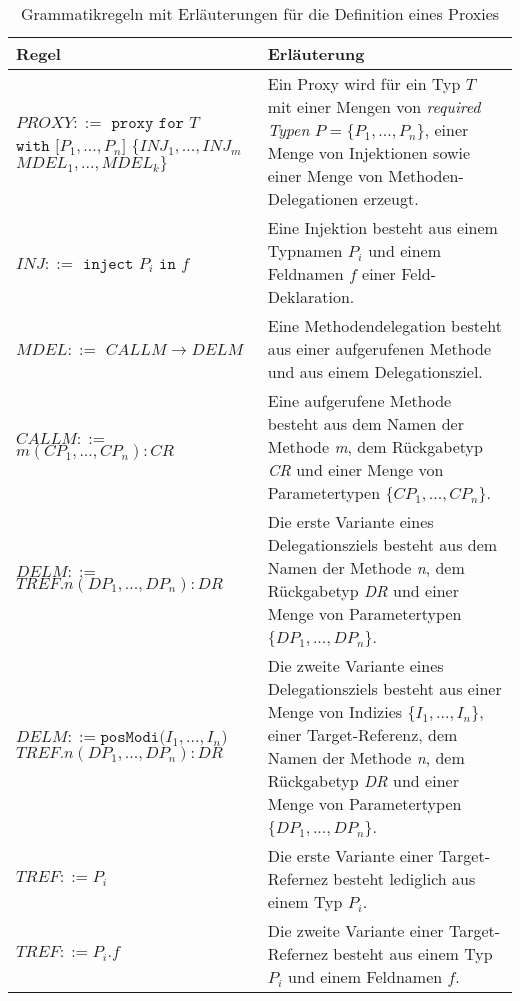 \documentclass[a4paper,12pt]{article}
\begin{document}
\begin{table}[H]
\centering
\begin{tabular}{|p{5cm}|p{9cm}|}
\hline
\hline
\centering\textbf{Regel} & \textbf{Erläuterung} \\
\hline
\hline
$\mathit{PROXY} ::=$\newline
$\texttt{proxy } \texttt{for } T$\newline
$ \texttt{with [}\mathit{P_1},...,\mathit{P_n}\texttt{]}$ \newline
$\texttt{\{} \mathit{INJ_1},...,\mathit{INJ_m}$\newline
$\mathit{MDEL_1},...,\mathit{MDEL_k} \texttt{\}}$
 & Ein Proxy wird für ein Typ $T$ mit einer Mengen von \emph{required Typen} $P = \{P_1,...,P_n\}$, einer Menge von Injektionen sowie einer Menge von Methoden-Delegationen erzeugt.\\
\hline
$\mathit{INJ} ::=$\newline 
$\texttt{inject } P_i \texttt{ in } f$ 
& Eine Injektion besteht aus einem Typnamen $P_i$ und einem Feldnamen $f$ einer Feld-Deklaration.\\
\hline
$\mathit{MDEL} ::=$\newline
$CALLM \rightarrow DELM $  & Eine Methodendelegation besteht aus einer aufgerufenen Methode und aus einem Delegationsziel.\\
\hline
$\mathit{CALLM} ::=$\newline $m(\mathit{CP_1},...,\mathit{CP_n}):CR $  & Eine aufgerufene Methode besteht aus dem Namen der Methode \emph{m}, dem Rückgabetyp \emph{CR} und einer Menge von Parametertypen $\{\mathit{CP_1},...,\mathit{CP_n}\}$.\\
\hline
$\mathit{DELM} ::=$\newline 
$\mathit{TREF}\texttt{.}n(\mathit{DP_1},...,\mathit{DP_n}):DR $  
& Die erste Variante eines Delegationsziels besteht aus  dem Namen der Methode \emph{n}, dem Rückgabetyp \emph{DR} und einer Menge von Parametertypen $\{\mathit{DP_1},...,\mathit{DP_n}\}$.\\
\hline
$\mathit{DELM} ::=\texttt{posModi(} \mathit{I_1},...,\mathit{I_n} \texttt{)}$\newline
$\mathit{TREF}\texttt{.}n(\mathit{DP_1},...,\mathit{DP_n}):DR $  
& Die zweite Variante eines Delegationsziels besteht aus einer Menge von Indizies $\{\mathit{I_1},...,\mathit{I_n}\}$, einer Target-Referenz, dem Namen der Methode \emph{n}, dem Rückgabetyp \emph{DR} und einer Menge von Parametertypen $\{\mathit{DP_1},...,\mathit{DP_n}\}$.\\
\hline
$\mathit{TREF} ::= \mathit{P_i}$
& Die erste Variante einer Target-Refernez besteht lediglich aus einem Typ $P_i$.\\
\hline
$\mathit{TREF} ::= \mathit{P_i}\texttt{.}\mathit{f}$
& Die zweite Variante einer Target-Refernez besteht aus einem Typ $P_i$ und einem Feldnamen $f$.\\
\hline
\end{tabular}
\caption{Grammatikregeln mit Erläuterungen für die Definition eines Proxies}
 \label{tab:grProxies}
\end{table}
\end{document}
